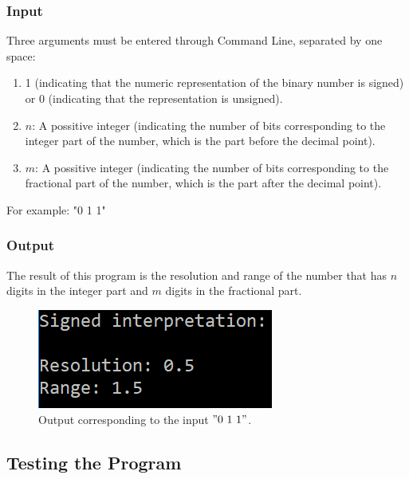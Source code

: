 \documentclass[a4paper,12pt]{report}
\begin{document}
\subsubsection{Input}
Three arguments must be entered through Command Line, separated by one space:
\begin{enumerate}
\item  1 (indicating that the numeric representation of the binary number is signed) or 0 (indicating that the representation is unsigned).
\item $n$: A possitive integer (indicating the number of bits corresponding to the integer part of the number, which is the part before the decimal point).
\item  $m$: A possitive integer (indicating the number of bits corresponding to the fractional part of the number, which is the part after the decimal point).
\end{enumerate}
For example: "0 1 1"

\subsubsection{Output}
The result of this program is the resolution and range of the number that has $n$ digits in the integer part and $m$ digits in the fractional part.

\begin{figure}[h!]
\centering
\includegraphics[scale=1]{ejemploOutput}
\caption{Output corresponding to the input $"0\ 1\ 1"$.}
\label{image output}
\end{figure}

\subsection{Testing the Program}



\end{document}
